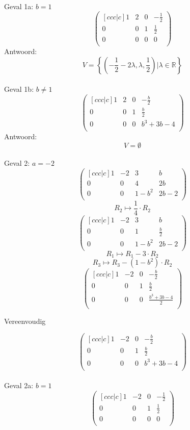 \documentclass[lineaire_algebra_oplossingen.tex]{subfiles}
\begin{document}
\\Geval 1a: $b=1$
\[
\begin{pmatrix}[ccc|c]
1 & 2 & 0 & -\frac{1}{2}\\
0 & 0 & 1 & \frac{1}{2}\\
0 & 0 & 0 & 0\\
\end{pmatrix}
\]
Antwoord:
\[
V = \left\lbrace \left(-\frac{1}{2}-2\lambda,\lambda,\frac{1}{2}\right)| \lambda \in \mathbb{R}\right\rbrace
\]
\\Geval 1b: $b\neq 1$
\[
\begin{pmatrix}[ccc|c]
1 & 2 & 0 & -\frac{b}{2}\\
0 & 0 & 1 & \frac{b}{2}\\
0 & 0 & 0 & b^{3}+3b-4\\
\end{pmatrix}
\]
Antwoord:
\[
V = \emptyset
\]
\\Geval 2: $a=-2$
\[
\begin{pmatrix}[ccc|c]
1 & -2 & 3 & b\\
0 & 0 & 4 & 2b\\
0 & 0 & 1-b^{2} & 2b-2\\
\end{pmatrix}
\]
\[ R_2 \longmapsto \frac{1}{4}\cdot R_2 \]
\[
\begin{pmatrix}[ccc|c]
1 & -2 & 3 & b\\
0 & 0 & 1 & \frac{b}{2}\\
0 & 0 & 1-b^{2} & 2b-2\\
\end{pmatrix}
\]
\[ R_1 \longmapsto R_1 - 3\cdot R_2 \]
\[ R_3 \longmapsto R_3 - (1-b^{2})\cdot R_2 \]
\[
\begin{pmatrix}[ccc|c]
1 & -2 & 0 & -\frac{b}{2}\\
0 & 0 & 1 & \frac{b}{2}\\
0 & 0 & 0 & \frac{b^3+3b-4}{2}\\
\end{pmatrix}
\]
\begin{center}
Vereenvoudig
\end{center}
\[
\begin{pmatrix}[ccc|c]
1 & -2 & 0 & -\frac{b}{2}\\
0 & 0 & 1 & \frac{b}{2}\\
0 & 0 & 0 & b^3+3b-4\\
\end{pmatrix}
\]
\\Geval 2a: $b=1$
\[
\begin{pmatrix}[ccc|c]
1 & -2 & 0 & -\frac{1}{2}\\
0 & 0 & 1 & \frac{1}{2}\\
0 & 0 & 0 & 0\\
\end{pmatrix}
\]
\end{document}
